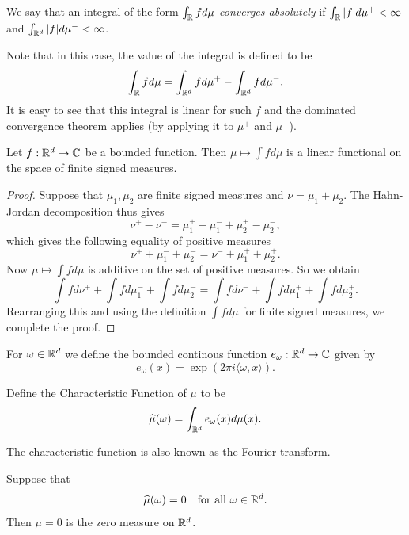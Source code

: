 \documentclass[twoside, a4paper, 10pt]{amsart}
\begin{document}
\begin{mydef}\label{def: abs conv signed mes} We say that an integral of the form $\int_{\mathbb{R}} f d\mu$ \textit{converges absolutely} if $\int_{\mathbb{R}} |f| d\mu^{+} < \infty$ and $\int_{\mathbb{R}^d} |f| d\mu^{-}< \infty$.
\end{mydef}

Note that in this case, the value of the integral is defined to be
$$\int_{\mathbb{R}} f d\mu = \int_{\mathbb{R}^d} f d\mu^{+} - \int_{\mathbb{R}^d} f d\mu^{-}.$$ It is easy to see that this integral is linear for such $f$ and the dominated convergence theorem applies (by applying it to $\mu^+$ and $\mu^-$).

\begin{lemma}\label{lemma: integral additive signed mes} Let $f:\mathbb{R}^d \to \mathbb{C}$ be a bounded function. Then $\mu \mapsto \int f d\mu$ is a linear functional on the space of finite signed measures. \end{lemma}

\begin{proof} Suppose that $\mu_1,\mu_2$ are finite signed measures and $\nu = \mu_1 + \mu_2$. The Hahn-Jordan decomposition thus gives 
$$\nu^{+} - \nu^{-} = \mu_1^+ - \mu_1^- + \mu_2^+ - \mu_2^-,$$ 
which gives the following equality of positive measures
$$\nu^+ + \mu_1^{-} + \mu_2^- = \nu^{-} + \mu_1^+ + \mu_2^+.$$ Now $\mu \mapsto \int f d\mu$ is additive on the set of positive measures. So we obtain
$$\int f d\nu^+ + \int f d\mu_1^{-} + \int f d\mu_2^- = \int f d\nu^{-} + \int f d\mu_1^+ + \int f d\mu_2^+.$$ Rearranging this and using the definition $\int f d\mu$ for finite signed measures, we complete the proof. \end{proof}

For $\omega \in \mathbb{R}^d$ we define the bounded continous function $e_{\omega}:\mathbb{R}^d \to \mathbb{C}$ given by $$e_{\omega}(x) = \exp(2\pi i\langle \omega, x \rangle).$$

\begin{mydef} Define the Characteristic Function of $\mu$ to be $$\widehat{\mu}(\omega) = \int_{\mathbb{R}^d} e_{\omega}(x) d\mu(x).$$

\end{mydef}

The characteristic function is also known as the Fourier transform.

\begin{thm} Suppose that $$\widehat{\mu}(\omega) = 0 \quad\text{for all } \omega \in \mathbb{R}^d.$$ Then $\mu = 0$ is the zero measure on $\mathbb{R}^d$.

\end{thm}
\end{document}
